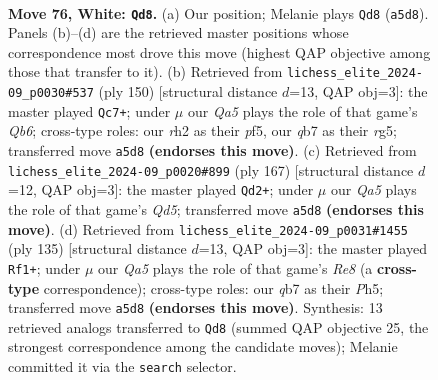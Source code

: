 \documentclass[11pt]{article}
\begin{document}
\clearpage

\begin{figure}[p]\centering
\begin{subfigure}{0.46\textwidth}\centering
\resizebox{\linewidth}{!}{%
\newchessgame
\chessboard[
  setfen={8/1q6/5pk1/Q7/8/4K1P1/7r/8 w - - 2 76},
  showmover=false,
  pgfstyle=straightmove, color=movearrow, markmove={a5-d8}
]}
\caption{}
\end{subfigure}\hfill
\begin{subfigure}{0.46\textwidth}\centering
\resizebox{\linewidth}{!}{%
\newchessgame
\chessboard[
  setfen={8/4kp2/1Q6/5pr1/8/8/8/5K2 w - - 23 76},
  showmover=false,
  pgfstyle=straightmove, color=movearrow, markmove={b6-c7}
]}
\caption{}
\end{subfigure}
\\[4pt]
\begin{subfigure}{0.46\textwidth}\centering
\resizebox{\linewidth}{!}{%
\newchessgame
\chessboard[
  setfen={8/8/4Q2P/6K1/3q4/8/8/1k6 b - - 16 84},
  showmover=false,
  pgfstyle=straightmove, color=movearrow, markmove={d4-d2}
]}
\caption{}
\end{subfigure}\hfill
\begin{subfigure}{0.46\textwidth}\centering
\resizebox{\linewidth}{!}{%
\newchessgame
\chessboard[
  setfen={1R6/5P2/2k2K2/7p/6p1/8/8/4r3 b - - 8 68},
  showmover=false,
  pgfstyle=straightmove, color=movearrow, markmove={e1-f1}
]}
\caption{}
\end{subfigure}
\caption{\textbf{Move 76, White: \texttt{Qd8}.} (a) Our position; Melanie plays \texttt{Qd8} (\texttt{a5d8}). Panels (b)--(d) are the retrieved master positions whose correspondence most drove this move (highest QAP objective among those that transfer to it). (b) Retrieved from \texttt{lichess\_elite\_2024-09\_p0030\#537} (ply 150) [structural distance $d$=13, QAP obj=3]: the master played \texttt{Qc7+}; under $\mu$ our \emph{Qa5} plays the role of that game's \emph{Qb6}; cross-type roles: our \emph{r}h2 as their \emph{p}f5, our \emph{q}b7 as their \emph{r}g5; transferred move \texttt{a5d8} \textbf{(endorses this move)}. (c) Retrieved from \texttt{lichess\_elite\_2024-09\_p0020\#899} (ply 167) [structural distance $d$=12, QAP obj=3]: the master played \texttt{Qd2+}; under $\mu$ our \emph{Qa5} plays the role of that game's \emph{Qd5}; transferred move \texttt{a5d8} \textbf{(endorses this move)}. (d) Retrieved from \texttt{lichess\_elite\_2024-09\_p0031\#1455} (ply 135) [structural distance $d$=13, QAP obj=3]: the master played \texttt{Rf1+}; under $\mu$ our \emph{Qa5} plays the role of that game's \emph{Re8} (a \textbf{cross-type} correspondence); cross-type roles: our \emph{q}b7 as their \emph{P}h5; transferred move \texttt{a5d8} \textbf{(endorses this move)}. Synthesis: 13 retrieved analogs transferred to \texttt{Qd8} (summed QAP objective 25, the strongest correspondence among the candidate moves); Melanie committed it via the \texttt{search} selector.}
\label{fig:thought-m150}
\end{figure}
\end{document}
